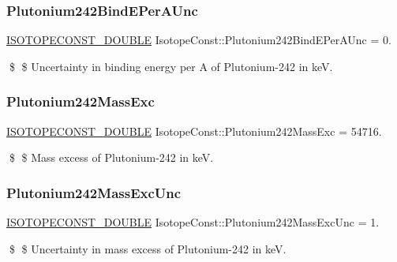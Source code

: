 \subsubsection{\texorpdfstring{Plutonium242\+Bind\+E\+Per\+A\+Unc}{Plutonium242BindEPerAUnc}}
{\footnotesize\ttfamily \mbox{\hyperlink{group___isotope_const-_macros_ga8f45a7272ce02c0b4c65c44636ed719a}{I\+S\+O\+T\+O\+P\+E\+C\+O\+N\+S\+T\+\_\+\+D\+O\+U\+B\+LE}} Isotope\+Const\+::\+Plutonium242\+Bind\+E\+Per\+A\+Unc = 0.}

\$ \$ Uncertainty in binding energy per A of Plutonium-\/242 in keV. \mbox{\label{group___isotope_const-_plutonium-_pu242_ga1dbc86d0512277168fae4b5d8c3d4d01}} 
\subsubsection{\texorpdfstring{Plutonium242\+Mass\+Exc}{Plutonium242MassExc}}
{\footnotesize\ttfamily \mbox{\hyperlink{group___isotope_const-_macros_ga8f45a7272ce02c0b4c65c44636ed719a}{I\+S\+O\+T\+O\+P\+E\+C\+O\+N\+S\+T\+\_\+\+D\+O\+U\+B\+LE}} Isotope\+Const\+::\+Plutonium242\+Mass\+Exc = 54716.}

\$ \$ Mass excess of Plutonium-\/242 in keV. \mbox{\label{group___isotope_const-_plutonium-_pu242_ga4dba7cbea210b0bceedb6acafc7f11b4}} 
\subsubsection{\texorpdfstring{Plutonium242\+Mass\+Exc\+Unc}{Plutonium242MassExcUnc}}
{\footnotesize\ttfamily \mbox{\hyperlink{group___isotope_const-_macros_ga8f45a7272ce02c0b4c65c44636ed719a}{I\+S\+O\+T\+O\+P\+E\+C\+O\+N\+S\+T\+\_\+\+D\+O\+U\+B\+LE}} Isotope\+Const\+::\+Plutonium242\+Mass\+Exc\+Unc = 1.}

\$ \$ Uncertainty in mass excess of Plutonium-\/242 in keV. \mbox{\label{group___isotope_const-_plutonium-_pu242_ga83738751aabd5ee43856301e6e84a7db}} 
